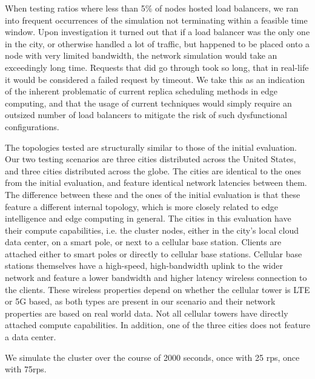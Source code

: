 \documentclass[draft,final]{vutinfth} %
\begin{document}
When testing ratios where less than 5\% of nodes hosted load balancers, we ran into frequent occurrences of the simulation not terminating within a feasible time window.
Upon investigation it turned out that if a load balancer was the only one in the city, or otherwise handled a lot of traffic, but happened to be placed onto a node with very limited bandwidth, the network simulation would take an exceedingly long time.
Requests that did go through took so long, that in real-life it would be considered a failed request by timeout.
We take this as an indication of the inherent problematic of current replica scheduling methods in edge computing, and that the usage of current techniques would simply require an outsized number of load balancers to mitigate the risk of such dysfunctional configurations.

The topologies tested are structurally similar to those of the initial evaluation.
Our two testing scenarios are three cities distributed across the United States, and three cities distributed across the globe.
The cities are identical to the ones from the initial evaluation, and feature identical network latencies between them.
The difference between these and the ones of the initial evaluation is that these feature a different internal topology, which is more closely related to edge intelligence\cite{rauschEdgeIntelligenceConvergence2019} and edge computing in general.
The cities in this evaluation have their compute capabilities, i.e. the cluster nodes, either in the city's local cloud data center, on a smart pole, or next to a cellular base station.
Clients are attached either to smart poles or directly to cellular base stations.
Cellular base stations themselves have a high-speed, high-bandwidth uplink to the wider network and feature a lower bandwidth and higher latency wireless connection to the clients.
These wireless properties depend on whether the cellular tower is LTE or 5G based, as both types are present in our scenario and their network properties are based on real world data\cite{braudMulticarrierMeasurementStudy2019}.
Not all cellular towers have directly attached compute capabilities.
In addition, one of the three cities does not feature a data center.

We simulate the cluster over the course of 2000 seconds, once with 25 \gls{rps}, once with 75\gls{rps}.
\end{document}
